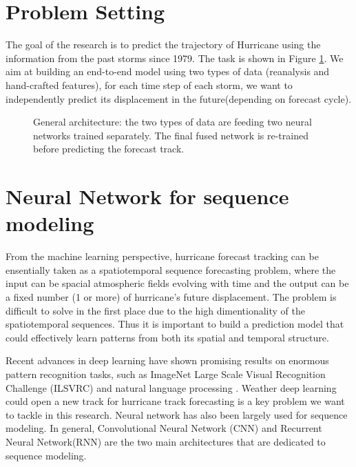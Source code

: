 \section{Problem Setting}
The goal of the research is to predict the trajectory of Hurricane using the information from the past storms since 1979. The task is shown in Figure \ref{fig::task}. We aim at building an end-to-end model using two types of data (reanalysis and hand-crafted features), for each time step of each storm, we want to independently predict its displacement in the future(depending on forecast cycle). 

\begin{figure}[H]
	\begin{center}
		\hsize {}
	\end{center}
	\caption{General architecture: the two types of data are feeding two neural networks trained separately. The final fused network is re-trained before predicting the forecast track. }
	\label{fig::task}
\end{figure}

\section{Neural Network for sequence modeling}
From the machine learning perspective, hurricane forecast tracking can be ensentially taken as a spatiotemporal sequence forecasting problem, where the input can be spacial atmospheric fields evolving with time and the output can be a fixed number (1 or more) of hurricane's future displacement. The problem is difficult to solve in the first place due to the high dimentionality of the spatiotemporal sequences. Thus it is important to build a prediction model that could effectively learn patterns from both its spatial and temporal structure. 

Recent advances in deep learning have shown promising results on enormous pattern recognition tasks, such as ImageNet Large Scale Visual Recognition Challenge (ILSVRC) \cite{russakovsky2015imagenet} \cite{krizhevsky2012imagenet}  \cite{szegedy2015going} and natural language processing \cite{goldberg2014word2vec} \cite{sutskever2014sequence}. Weather deep learning could open a new track for hurricane track forecasting is a key problem we want to tackle in this research. Neural network has also been largely used for sequence modeling. In general, Convolutional Neural Network (CNN) and Recurrent Neural Network(RNN) are the two main architectures that are dedicated to sequence modeling. 

